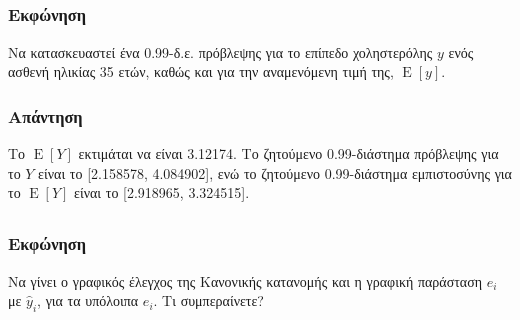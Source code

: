 \documentclass{article}
\DeclareMathOperator{\E}{\mathrm{E}}
\begin{document}
\subsection{}
\subsubsection*{Εκφώνηση}
Να κατασκευαστεί ένα 0.99-δ.ε. πρόβλεψης για το επίπεδο χοληστερόλης \(y\) ενός
ασθενή ηλικίας 35 ετών, καθώς και για την αναμενόμενη τιμή της, \(\E[y]\).
\subsubsection*{Απάντηση}
Το \(\E[Y]\) εκτιμάται να είναι 3.12174.
Το ζητούμενο 0.99-διάστημα πρόβλεψης για το \(Y\) είναι το [2.158578, 4.084902],
ενώ το ζητούμενο 0.99-διάστημα εμπιστοσύνης για το \(\E[Y]\) είναι το [2.918965, 3.324515].

\subsection{}
\subsubsection*{Εκφώνηση}
Να γίνει ο γραφικός έλεγχος της Κανονικής κατανομής και η γραφική
παράσταση \(e_i\) με \(\hat{y}_i\), για τα υπόλοιπα \(e_i\). Τι συμπεραίνετε?
\end{document}
